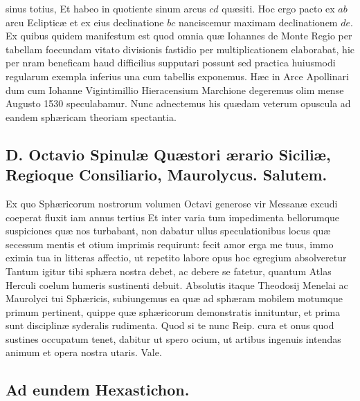 \documentclass[11pt,a4paper]{article}
\begin{document}
sinus totius, Et habeo in quotiente sinum arcus $cd$ quæsiti. Hoc
ergo pacto ex $ab$ arcu Eclipticæ et ex eius declinatione $bc$
nanciscemur maximam declinationem $de$. Ex quibus
quidem manifestum est quod omnia \ill{} quæ Iohannes
de Monte Regio per tabellam foecundam vitato divisionis
fastidio per multiplicationem elaborabat, hic per nram
beneficam haud difficilius supputari possunt sed practica
huiusmodi regularum exempla inferius una cum tabellis
exponemus. Hæc in Arce Apollinari dum cum Iohanne
Vigintimillio Hieracensium Marchione degeremus olim
mense Augusto 1530 speculabamur. Nunc adnectemus
his quædam veterum opuscula ad eandem sphæricam
theoriam spectantia.

\subsection*{D. Octavio Spinulæ Quæstori ærario Siciliæ, Regioque Consiliario, Maurolycus. Salutem.}

Ex quo Sphæricorum nostrorum volumen Octavi generose
vir Messanæ excudi coeperat fluxit iam annus tertius
Et inter varia tum impedimenta bellorumque suspiciones
quæ nos turbabant, non dabatur ullus speculationibus
locus quæ secessum mentis et otium imprimis requirunt:
fecit amor erga me tuus, immo eximia tua in litteras
affectio, ut repetito labore opus hoc egregium absolveretur
Tantum igitur tibi sphæra nostra debet, ac debere se
fatetur, quantum Atlas Herculi coelum humeris sustinenti
debuit. Absolutis itaque Theodosij Menelai ac Maurolyci
tui Sphæricis, subiungemus ea quæ ad sphæram mobilem
motumque primum pertinent, quippe quæ sphæricorum
demonstratis innituntur, et prima sunt disciplinæ
syderalis rudimenta. Quod si te nunc Reip. cura et onus
quod sustines occupatum tenet, dabitur ut spero 
ocium, ut artibus ingenuis intendas animum et opera
nostra utaris. Vale.

\subsection*{Ad eundem Hexastichon.}
\end{document}
